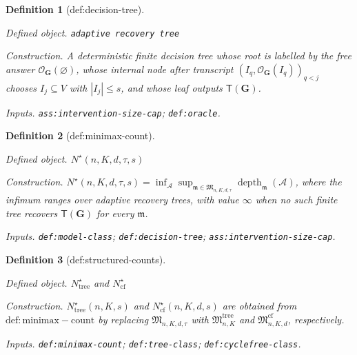 \documentclass{article}
\newtheorem{definition}{Definition}
\begin{document}
\begin{definition}[def:decision-tree]\label{def:decision-tree}
\par\smallskip\noindent\emph{Defined object.} \texttt{adaptive recovery tree}
\par\smallskip\noindent\emph{Construction.} A deterministic finite decision tree whose root is labelled by the free answer \(\mathcal O_{\mathbf G}(\varnothing)\), whose internal node after transcript \((I_q,\mathcal O_{\mathbf G}(I_q))_{q<j}\) chooses \(I_j\subseteq V\) with \(|I_j|\le s\), and whose leaf outputs \(\mathsf T(\mathbf G)\).
\par\smallskip\noindent\emph{Inputs.} \texttt{ass:\allowbreak{}intervention-\allowbreak{}size-\allowbreak{}cap}; \texttt{def:\allowbreak{}oracle}.
\end{definition}

\begin{definition}[def:minimax-count]\label{def:minimax-count}
\par\smallskip\noindent\emph{Defined object.} \(N^{\star}(n,K,d,\tau,s)\)
\par\smallskip\noindent\emph{Construction.} \(N^{\star}(n,K,d,\tau,s)=\inf_{\mathcal A}\sup_{\mathfrak m\in\mathfrak M_{n,K,d,\tau}}\operatorname{depth}_{\mathfrak m}(\mathcal A)\), where the infimum ranges over adaptive recovery trees, with value \(\infty\) when no such finite tree recovers \(\mathsf T(\mathbf G)\) for every \(\mathfrak m\).
\par\smallskip\noindent\emph{Inputs.} \texttt{def:\allowbreak{}model-\allowbreak{}class}; \texttt{def:\allowbreak{}decision-\allowbreak{}tree}; \texttt{ass:\allowbreak{}intervention-\allowbreak{}size-\allowbreak{}cap}.
\end{definition}

\begin{definition}[def:structured-counts]\label{def:structured-counts}
\par\smallskip\noindent\emph{Defined object.} \(N^{\star}_{\mathrm{tree}}\) and \(N^{\star}_{\mathrm{cf}}\)
\par\smallskip\noindent\emph{Construction.} \(N^{\star}_{\mathrm{tree}}(n,K,s)\) and \(N^{\star}_{\mathrm{cf}}(n,K,d,s)\) are obtained from \(\mathrm{def:minimax-count}\) by replacing \(\mathfrak M_{n,K,d,\tau}\) with \(\mathfrak M^{\mathrm{tree}}_{n,K}\) and \(\mathfrak M^{\mathrm{cf}}_{n,K,d}\), respectively.
\par\smallskip\noindent\emph{Inputs.} \texttt{def:\allowbreak{}minimax-\allowbreak{}count}; \texttt{def:\allowbreak{}tree-\allowbreak{}class}; \texttt{def:\allowbreak{}cyclefree-\allowbreak{}class}.
\end{definition}
\end{document}
